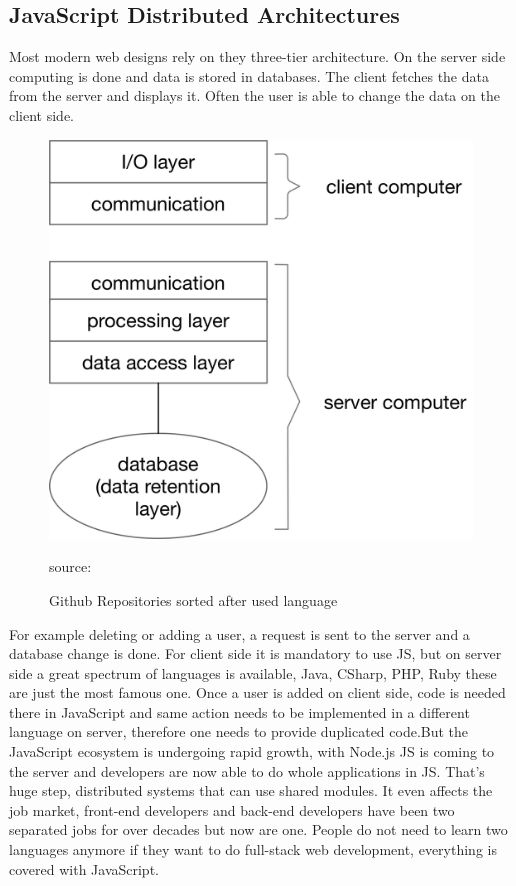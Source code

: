 \newpage

\subsection{JavaScript Distributed Architectures}
Most modern web designs rely on they three-tier architecture. On the server side computing is done and data is stored in databases. The client fetches the data from the server and displays it. Often the user is able to change the data on the client side. 
\begin{figure}[hb]
	\centering
	\includegraphics[scale=0.5]{bilder/grundlagen/Three-Tier.png}
	\caption{Github Repositories sorted after used language} source:\cite{JS}
	\label{fig:JS}
\end{figure}
For example deleting or adding a user, a request is sent to the server and a database change is done. For client side it is mandatory to use \gls{JS}, but on server side  a great spectrum of languages is available, Java, CSharp, PHP, Ruby these are just the most famous one. Once a user is added on client side, code is needed there in JavaScript and same action needs to be implemented in a different language on server, therefore one needs to provide duplicated code.But the JavaScript ecosystem is undergoing rapid growth, with Node.js \gls{JS} is coming to the server and developers are now able to do whole applications in \gls{JS}. That's huge step, distributed systems that can use shared modules. It even affects the job market, front-end developers and back-end developers have been two separated jobs for over decades but now are one. People do not need to learn two languages anymore if they want to do full-stack web development, everything is covered with JavaScript.

